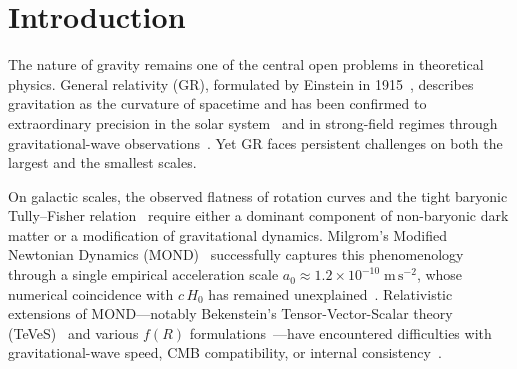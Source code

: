 \documentclass[aps,prd,onecolumn,superscriptaddress,nofootinbib,showpacs,12pt]{revtex4-2}
\newcommand{\azero}{a_{0}}
\begin{document}
%
%
%
%
%

\section{Introduction}\label{sec:intro}

The nature of gravity remains one of the central open problems in
theoretical physics.  General relativity (GR), formulated by
Einstein in 1915~\cite{Einstein1915}, describes gravitation as the
curvature of spacetime and has been confirmed to extraordinary
precision in the solar system~\cite{Will2014,Will2018} and in
strong-field regimes through gravitational-wave
observations~\cite{LIGO2016,LIGO_GW170817}.  Yet GR faces
persistent challenges on both the largest and the smallest scales.

On galactic scales, the observed flatness of rotation curves and the
tight baryonic Tully--Fisher relation~\cite{TullyFisher1977,McGaugh2016}
require either a dominant component of non-baryonic dark matter or a
modification of gravitational dynamics.  Milgrom's Modified Newtonian
Dynamics (MOND)~\cite{Milgrom1983a} successfully captures this
phenomenology through a single empirical acceleration scale
$\azero \approx 1.2 \times 10^{-10}\;\mathrm{m\,s^{-2}}$, whose
numerical coincidence with $c\,H_{0}$ has remained
unexplained~\cite{Milgrom1999,Famaey2012}.  Relativistic extensions
of MOND---notably Bekenstein's Tensor-Vector-Scalar theory
(TeVeS)~\cite{Bekenstein2004} and various $f(R)$
formulations~\cite{Sotiriou2010}---have encountered difficulties with
gravitational-wave speed, CMB compatibility, or internal
consistency~\cite{BrunetonEsposito2007}.
\end{document}
